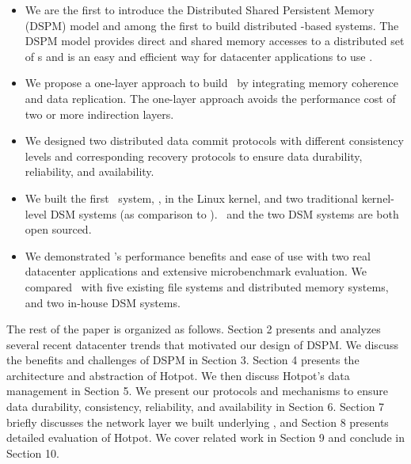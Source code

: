 \begin{itemize}
\item We are the first to introduce the Distributed Shared Persistent Memory (DSPM) model
and among the first to build distributed \nvm-based systems.
The DSPM model provides direct and shared memory accesses to a distributed set of \nvm{}s 
and is an easy and efficient way for datacenter applications to use \nvm.

\item We propose a one-layer approach to build \dsnvm\ by 
integrating memory coherence and data replication.
The one-layer approach avoids the performance cost of two or more indirection layers.

\item We designed two distributed data commit protocols with different consistency levels 
and corresponding recovery protocols to 
ensure data durability, reliability, and availability.

\item We built the first \dsnvm\ system, \hotpot, in the Linux kernel, 
and two traditional kernel-level DSM systems (as comparison to \hotpot). 
\hotpot\ and the two DSM systems are both open sourced.

\item We demonstrated \hotpot's performance benefits and ease of use with two real datacenter applications
and extensive microbenchmark evaluation. 
We compared \hotpot\ with five existing file systems and distributed memory systems, 
and two in-house DSM systems.

\end{itemize}

The rest of the paper is organized as follows.
Section 2 presents and analyzes several recent datacenter trends that motivated our design of DSPM.
We discuss the benefits and challenges of DSPM in Section 3.
Section 4 presents the architecture and abstraction of Hotpot.
We then discuss Hotpot's data management in Section 5.
We present our protocols and mechanisms to ensure data durability, consistency, reliability, and availability in Section 6.
Section 7 briefly discusses the network layer we built underlying \hotpot,
and Section 8 presents detailed evaluation of Hotpot.
We cover related work in Section 9 and conclude in Section 10.
